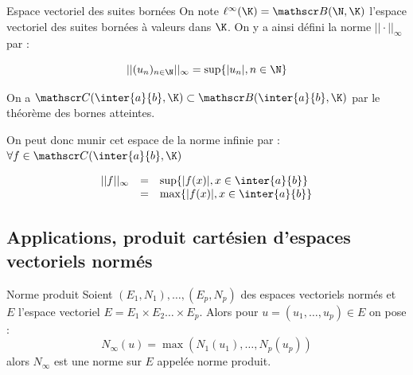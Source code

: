 \begin{definition}{Espace vectoriel des suites bornées}{}
    On note $\ell^\infty(\K) = \mathscr B(\N, \K)$ l'espace vectoriel des suites bornées
    à valeurs dans $\K$. On y a ainsi défini la norme $|| \cdot ||_\infty$ par :

    \[||(u_n)_{n \in \N} ||_\infty = \sup\{|u_n|, n \in \N\}\]
\end{definition}

\begin{definition}{}{}
    On a $\mathscr C(\inter{a}{b}, \K) \subset \mathscr B(\inter{a}{b}, \K)$
    par le théorème des bornes atteintes. 

    On peut donc munir cet espace de la norme infinie par : 
    $\forall f \in \mathscr C(\inter{a}{b}, \K)$

    \[
    \begin{array}{rcl}
        ||f ||_\infty & =& \sup\{|f(x)|, x \in \inter{a}{b}\} \\
        \space & = & \max\{|f(x)|, x \in \inter{a}{b}\} \\
    \end{array}
    \]
\end{definition}

\subsection{Applications, produit cartésien d'espaces vectoriels normés}

\begin{theoreme}{Norme produit}{}
    Soient $(E_1, N_1), \dots, (E_p, N_p)$ des espaces vectoriels normés
    et $E$ l'espace vectoriel $E = E_1 \times E_2 \dots \times E_p$.
    Alors pour $u = (u_1, \dots, u_p) \in E$ on pose :
    \[N_\infty(u) = \max(N_1(u_1), \dots, N_p(u_p))\]
    alors $N_\infty$ est une norme sur $E$ appelée norme produit. 
\end{theoreme}

